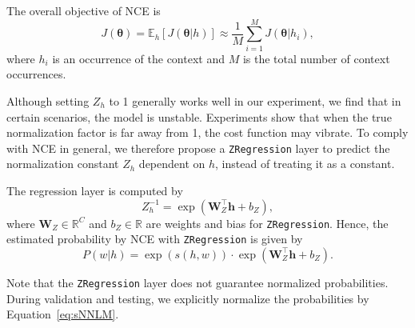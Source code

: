 \documentclass[11pt]{article}
\renewcommand{\vector}[1]{\bm{#1}}
\newcommand{\trans}[1]{#1^{\top}}
\def\Encoding{\texttt{Encoding}}
\begin{document}
The overall objective of NCE is
\begin{equation*}
J(\vector{\theta}) = \mathbb{E}_h [J(\vector{\theta}|h)] \approx \dfrac{1}{M} \sum_{i=1}^{M} J(\vector{\theta}|h_i),
\end{equation*}
where $h_i$ is an occurrence of the context and $M$ is the total number of context occurrences.



Although setting $Z_h$ to 1 generally works well in our experiment, we find that in certain scenarios, the model is unstable. Experiments show that when the true normalization factor is far away from 1, the cost function may vibrate. To comply with NCE in general,
we therefore propose a \texttt{ZRegression} layer to predict the normalization constant $Z_h$ dependent on $h$, instead of treating it as a constant.

The regression layer is computed by
\[
Z_h^{-1} = \exp(\trans{\vector{W}_Z}\vector{h}+b_Z),
\]
where $\vector{W}_Z\in \mathbb{R}^{C}$ and $b_Z\in \mathbb{R}$
are weights and bias for \texttt{ZRegression}.
Hence, the estimated probability by NCE with \texttt{ZRegression} is given by
\begin{equation*}\nonumber
 P(w|h) = \exp(s(h,w)) \cdot \exp(\trans{\vector{W}_Z}\vector{h}+b_Z).
\end{equation*}

Note that the \texttt{ZRegression} layer does not guarantee normalized probabilities.
During validation and testing, we explicitly normalize the probabilities by Equation~\eqref{eq:sNNLM}.


\begin{table}[!t]
\centering
{}
\caption{Statistics of our corpus.\label{tab:corpus_stat}}
\end{table}
\end{document}
